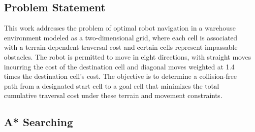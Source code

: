 \documentclass[14pt]{extarticle}
\begin{document}
\subsection*{Problem Statement}


This work addresses the problem of optimal robot navigation in a warehouse environment modeled as a two-dimensional grid, where each cell is associated with a terrain-dependent traversal cost and certain cells represent impassable obstacles. The robot is permitted to move in eight directions, with straight moves incurring the cost of the destination cell and diagonal moves weighted at 1.4 times the destination cell's cost. The objective is to determine a collision-free path from a designated start cell to a goal cell that minimizes the total cumulative traversal cost under these terrain and movement constraints.



\subsection*{A* Searching}
\end{document}
